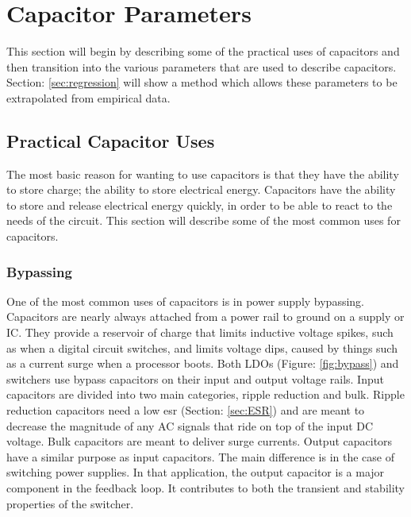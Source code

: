 \section {Capacitor Parameters}
\label{sec:params}

\renewcommand{\loadeq}[1]{%
   \ExecuteMetaData[./equations/parameters.tex]{eq#1}%
}

This section will begin by describing some of the practical uses of capacitors and then transition into the various parameters that are used to describe capacitors. Section: \ref{sec:regression} will show a method which allows these parameters to be extrapolated from empirical data.

\subsection{Practical Capacitor Uses}

The most basic reason for wanting to use capacitors is that they  have the ability to store charge; the ability to store electrical energy. Capacitors have the ability to store and release electrical energy quickly, in order to be able to react to the needs of the circuit. This section will describe some of the most common uses for capacitors.

\subsubsection{Bypassing}


One of the most common uses of capacitors is in power supply bypassing. Capacitors are nearly always attached from a power rail to ground on a supply or IC. They provide a reservoir of charge that limits inductive voltage spikes, such as when a digital circuit switches, and limits voltage dips, caused by things such as a current surge when a processor boots.
Both LDOs (Figure: \ref{fig:bypass}) and switchers use bypass capacitors on their input and output voltage rails. Input capacitors are divided into two main categories, ripple reduction and bulk. Ripple reduction capacitors need a low \gls{esr} (Section: \ref{sec:ESR}) and are meant to decrease the magnitude of any AC signals that ride on top of the input DC voltage. Bulk capacitors are meant to deliver surge currents. Output capacitors have a similar purpose as input capacitors. The main difference is in the case of switching power supplies. In that application, the output capacitor is a major component in the feedback loop. It contributes to both the transient and stability properties of the switcher.

